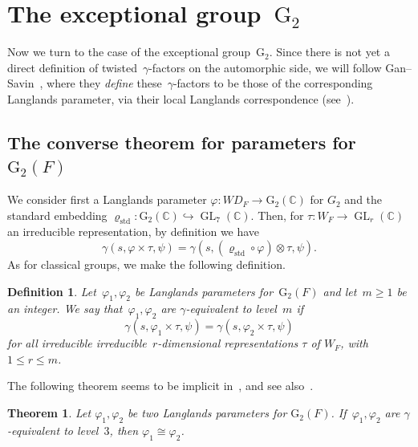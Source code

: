 \documentclass[12pt]{amsart}
\newcommand{\GL}{\operatorname{GL}}
\newcommand{\G}{\mathrm{G}}
\newcommand{\WD}{{WD}}
\def\rhostd{\varrho_{\mathrm{std}}} %
\newtheorem{thm}{Theorem}[section]
\newtheorem{defn}[thm]{Definition}
\newtheorem{thm}[equation]{Theorem}
\newtheorem{defn}[equation]{Definition}
\begin{document}
\section{The exceptional group~$\G_2$}\label{g2section}

Now we turn to the case of the exceptional group~$\G_2$. Since there is not yet a direct definition of twisted~$\gamma$-factors on the automorphic side, we will follow Gan--Savin~\cite{GS23b}, where they \emph{define} these~$\gamma$-factors to be those of the corresponding Langlands parameter, via their local Langlands correspondence (see~\cite{GS23a}). 

\subsection{The converse theorem for parameters for $\G_2(F)$}
We consider first a Langlands parameter $\varphi : \WD_F \rightarrow \G_2(\mathbb{C})$ for $G_2$ and the standard embedding $\rhostd : \G_2(\mathbb{C}) \hookrightarrow \GL_7(\mathbb{C})$. Then, for $\tau : W_F \rightarrow \GL_r(\mathbb{C})$ an irreducible representation, by definition we have
\[
\gamma(s, \varphi \times \tau, \psi)=\gamma(s, (\rhostd\circ \varphi) \otimes \tau, \psi).
\]
As for classical groups, we make the following definition.

\begin{defn} Let~$\varphi_1,\varphi_2$ be Langlands parameters for~$\G_2(F)$ and let~$m\ge 1$ be an integer. We say that~$\varphi_1,\varphi_2$ are \emph{$\gamma$-equivalent to level~$m$} if
\[
\gamma(s, \varphi_1 \times \tau, \psi) = \gamma(s, \varphi_2 \times \tau, \psi)
\]
for all irreducible irreducible~$r$-dimensional representations $\tau$ of $W_F$, with $1\le r\le m$.
\end{defn}

The following theorem seems to be implicit in~\cite{GS23b}, and see also~\cite[Theorem~8.2(b)]{M24}. 

\begin{thm}\label{g2converse}
Let $\varphi_1, \varphi_2$ be two Langlands parameters for $\G_2(F)$.  If~$\varphi_1,\varphi_2$ are $\gamma$-equivalent to level~$3$, then $\varphi_1 \cong \varphi_2$. 
\end{thm}
\end{document}
